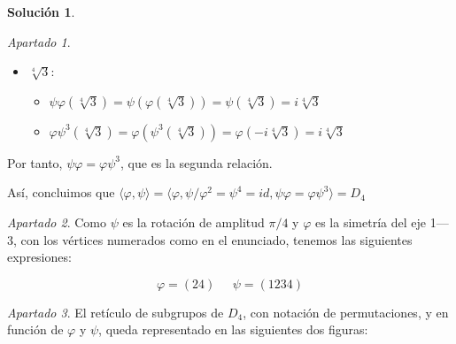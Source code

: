 \documentclass[a4paper, 11pt]{article}
\theoremstyle{definition}
\newtheorem*{solucion}{Solución}
\theoremstyle{remark}
\newtheorem{apartado}{Apartado}[ejercicio]
\begin{document}
\begin{solucion}
\begin{apartado}
\begin{itemize}
              \item \textbf{$\sqrt[4]{3}$}:
              \begin{itemize}
                  \item $\psi\varphi(\sqrt[4]{3}) = \psi(\varphi(\sqrt[4]{3})) = \psi(\sqrt[4]{3}) = i\sqrt[4]{3}$
                  \item $\varphi\psi^3(\sqrt[4]{3}) = \varphi(\psi^3(\sqrt[4]{3})) = \varphi(-i\sqrt[4]{3}) = i\sqrt[4]{3}$
              \end{itemize}
          \end{itemize}

          Por tanto, $\psi\varphi = \varphi\psi^3$, que es la segunda relación.

          Así, concluimos que $\langle\varphi,\psi\rangle = \langle\varphi,\psi / \varphi^2 = \psi^4 = id, \psi\varphi = \varphi\psi^3\rangle = D_4$
      \end{apartado}

      \begin{apartado}
          Como $\psi$ es la rotación de amplitud $\pi/4$ y $\varphi$ es la simetría del eje 1---3, con los vértices numerados como en el enunciado, tenemos las siguientes expresiones:

          \[
          \varphi = (24) \;\;\;\;\; \psi = (1234)
          \]
      \end{apartado}

      \begin{apartado}
          El retículo de subgrupos de $D_4$, con notación de permutaciones, y en función de $\varphi$ y $\psi$, queda representado en las siguientes dos figuras:
          \vspace{1 cm}

          \centering
\end{apartado}
\end{solucion}
\end{document}
